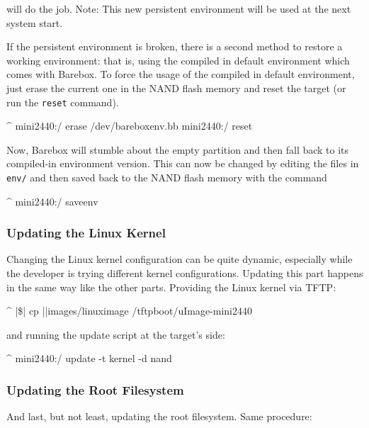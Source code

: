 will do the job. Note: This new persistent environment will be used at the next
system start.

If the persistent environment is broken, there is a second method to restore a
working environment: that is, using the compiled in default environment which
comes with Barebox.
To force the usage of the compiled in default environment, just erase the
current one in the NAND flash memory and reset the target (or run the
\texttt{reset} command).

\begin{ptxshell}[escapechar=|]{^}
mini2440:/ erase /dev/bareboxenv.bb
mini2440:/ reset
\end{ptxshell}

Now, Barebox will stumble about the empty partition and then fall back to its
compiled-in environment version. This can now be changed by editing the files
in \texttt{env/} and then saved back to the NAND flash memory with the command

\begin{ptxshell}[escapechar=|]{^}
mini2440:/ saveenv
\end{ptxshell}

\subsubsection{Updating the Linux Kernel}

Changing the Linux kernel configuration can be quite dynamic, especially while
the developer is trying different kernel configurations. Updating this part
happens in the same way like the other parts. Providing the Linux kernel via
TFTP:

\begin{ptxshell}[escapechar=|]{^}
|\$| cp |\ptxdistPlatformDir |images/linuximage /tftpboot/uImage-mini2440
\end{ptxshell}

and running the update script at the target's side:

\begin{ptxshell}[escapechar=|]{^}
mini2440:/ update -t kernel -d nand
\end{ptxshell}

\subsubsection{Updating the Root Filesystem}

And last, but not least, updating the root filesystem. Same procedure:

